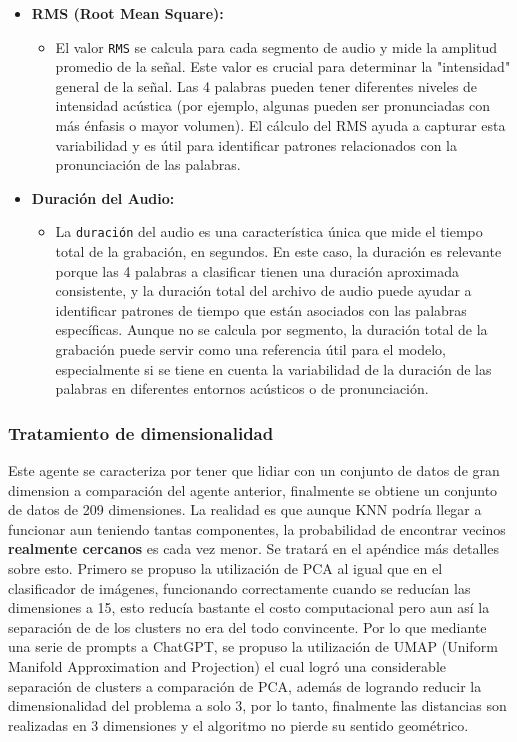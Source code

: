 \documentclass[12pt,a4paper]{article}
\begin{document}
\begin{itemize}
\item \textbf{RMS (Root Mean Square):}
  \begin{itemize}
    \item El valor \texttt{RMS} se calcula para cada segmento de audio y mide la amplitud promedio de la señal. Este valor es crucial para determinar la "intensidad" general de la señal. Las 4 palabras pueden tener diferentes niveles de intensidad acústica (por ejemplo, algunas pueden ser pronunciadas con más énfasis o mayor volumen). El cálculo del RMS ayuda a capturar esta variabilidad y es útil para identificar patrones relacionados con la pronunciación de las palabras.
  \end{itemize}

\item \textbf{Duración del Audio:}
  \begin{itemize}
    \item La \texttt{duración} del audio es una característica única que mide el tiempo total de la grabación, en segundos. En este caso, la duración es relevante porque las 4 palabras a clasificar tienen una duración aproximada consistente, y la duración total del archivo de audio puede ayudar a identificar patrones de tiempo que están asociados con las palabras específicas. Aunque no se calcula por segmento, la duración total de la grabación puede servir como una referencia útil para el modelo, especialmente si se tiene en cuenta la variabilidad de la duración de las palabras en diferentes entornos acústicos o de pronunciación.
  \end{itemize}

\end{itemize}
\subsubsection*{Tratamiento de dimensionalidad}
Este agente se caracteriza por tener que lidiar con un conjunto de datos de gran dimension a comparación del agente anterior, finalmente se obtiene un conjunto de datos de 209 dimensiones. La realidad es que aunque KNN podría llegar a funcionar aun teniendo tantas componentes, la probabilidad de encontrar vecinos \textbf{realmente cercanos} es cada vez menor. Se tratará en el apéndice más detalles sobre esto. 
Primero se propuso la utilización de PCA al igual que en el clasificador de imágenes, funcionando correctamente cuando se reducían las dimensiones a 15, esto reducía bastante el costo computacional pero aun así la separación de de los clusters no era del todo convincente. Por lo que mediante una serie de prompts a ChatGPT, se propuso la utilización de UMAP (Uniform Manifold Approximation and Projection) el cual logró una considerable separación de clusters a comparación de PCA, además de logrando reducir la dimensionalidad del problema a solo 3, por lo tanto, finalmente las distancias son realizadas en 3 dimensiones y el algoritmo no pierde su sentido geométrico.
\end{document}
